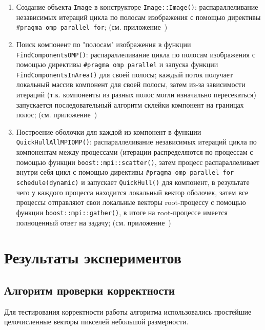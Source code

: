 \documentclass[12pt]{article}
\begin{document}
\begin{enumerate}
    \item Создание объекта \texttt{Image} в конструкторе \texttt{Image::Image()}: распараллеливание независимых итераций цикла по полосам изображения с помощью директивы \texttt{\#pragma omp parallel for}; (см. приложение~)
    \item Поиск компонент по "полосам" изображения в функции \texttt{FindComponentsOMP()}: распараллеливание цикла по полосам изображения с помощью директивы \texttt{\#pragma omp parallel} и запуска функции \texttt{FindComponentsInArea()} для своей полосы; каждый поток получает локальный массив компонент для своей полосы, затем из-за зависимости итераций (т.к. компоненты из разных полос могли изначально пересекаться) запускается последовательный алгоритм склейки компонент на границах полос; (см. приложение~)
    \item Построение оболочки для каждой из компонент в функции \texttt{QuickHullAllMPIOMP()}: распараллеливание независимых итераций цикла по компонентам между процессами (итерации распределяются по процессам с помощью функции \texttt{boost::mpi::scatter()}, затем процесс распараллеливает внутри себя цикл с помощью директивы \texttt{\#pragma omp parallel for schedule(dynamic)} и запускает \texttt{QuickHull()} для компонент, в результате чего у каждого процесса находится локальный вектор оболочек, затем все процессы отправляют свои локальные векторы root-процессу с помощью функции \texttt{boost::mpi::gather()}, в итоге на root-процессе имеется полноценный ответ на задачу; (см. приложение~)
\end{enumerate}

\newpage

\section{Результаты экспериментов}
\subsection{Алгоритм проверки корректности}
Для тестирования корректности работы алгоритма использовались простейшие целочисленные векторы пикселей небольшой размерности. 
\end{document}
